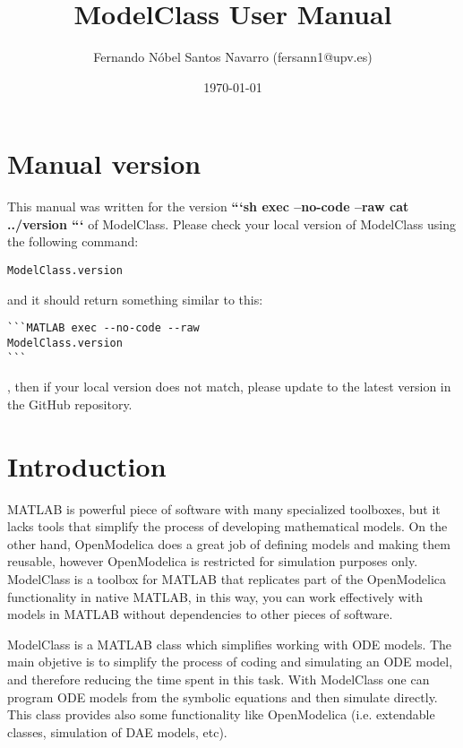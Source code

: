 \documentclass[11pt]{article}
\title{ModelClass User Manual}
\author{Fernando Nóbel Santos Navarro (fersann1@upv.es)}
\date{\today}
\begin{document}
\maketitle

\tableofcontents

\newpage 

\setlength{\parskip}{0.5em}

\section{Manual version}

This manual was written for the version \textbf{ 
```sh exec --no-code --raw
cat ../version
```
} of ModelClass. Please check your local version of ModelClass using the following command:

\begin{lstlisting}
ModelClass.version
\end{lstlisting}

and it should return something similar to this:

\begin{lstlisting}
```MATLAB exec --no-code --raw
ModelClass.version
```
\end{lstlisting}
, then if your local version does not match, please update to the latest version in the GitHub repository.

\section{Introduction}

MATLAB is powerful piece of software with many specialized toolboxes, but it lacks tools that simplify the process of developing mathematical models.
On the other hand, OpenModelica does a great job of defining models and making them reusable, however OpenModelica is restricted for simulation purposes only.
ModelClass is a toolbox for MATLAB that replicates part of the OpenModelica functionality in native MATLAB, in this way, you can work effectively with models in MATLAB without dependencies to other pieces of software.

ModelClass is a MATLAB class which simplifies working with ODE models. The main objetive is to simplify the process of coding and simulating an ODE model, and therefore reducing the time spent in this task. With ModelClass one can program ODE models from the symbolic equations and then simulate directly. This class provides also some functionality like OpenModelica (i.e. extendable classes, simulation of DAE models, etc).
\end{document}
